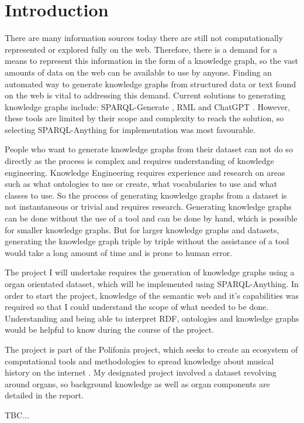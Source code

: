 \chapter{Introduction}
There are many information sources today there are still not computationally represented or explored fully on the web. Therefore, there is a demand for a means to represent this information in the form of a knowledge graph, so the vast amounts of data on the web can be available to use by anyone. Finding an automated way to generate knowledge graphs from structured data or text found on the web is vital to addressing this demand. Current solutions to generating knowledge graphs include: SPARQL-Generate \cite{sparqlgenerate}, RML \cite{rml} and ChatGPT \cite{chatgptwebsite}. However, these tools are limited by their scope and complexity to reach the solution, so selecting SPARQL-Anything \cite{sparqlanythinggithub} for implementation was most favourable. 

People who want to generate knowledge graphs from their dataset can not do so directly as the process is complex and requires understanding of knowledge engineering. Knowledge Engineering requires experience and research on areas such as what ontologies to use or create, what vocabularies to use and what classes to use. So the process of generating knowledge graphs from a dataset is not instantaneous or trivial and requires research. Generating knowledge graphs can be done without the use of a tool and can be done by hand, which is possible for smaller knowledge graphs. But for larger knowledge graphs and datasets, generating the knowledge graph triple by triple without the assistance of a tool would take a long amount of time and is prone to human error.

The project I will undertake requires the generation of knowledge graphs using a organ orientated dataset, which will be implemented using SPARQL-Anything. In order to start the project, knowledge of the semantic web and it's capabilities was required so that I could understand the scope of what needed to be done. Understanding and being able to interpret RDF, ontologies and knowledge graphs would be helpful to know during the course of the project. 

The project is part of the Polifonia project, which seeks to create an ecosystem of computational tools and methodologies to spread knowledge about musical history on the internet \cite{polifoniaproject}. My designated project involved a dataset revolving around organs, so background knowledge as well as organ components are detailed in the report. 


TBC...
